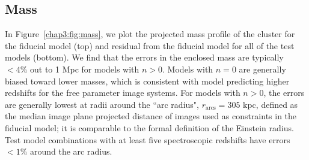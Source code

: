 \subsection{Mass}
In Figure~\ref{chap3:fig:mass}, we plot the projected mass profile of the cluster for the fiducial model (top) and residual from the fiducial model for all of the test models (bottom). We find that the errors in the enclosed mass are typically $<4\%$ out to 1 Mpc for models with $n>0$. Models with $n=0$ are generally biased toward lower masses, which is consistent with model predicting higher redshifts for the free parameter image systems. For models with $n>0$, the errors are generally lowest at radii around the ``arc radius", $r_\mathrm{arcs}=305$ kpc, defined as the median image plane projected distance of images used as constraints in the fiducial model; it is comparable to the formal definition of the Einstein radius. Test model combinations with at least five spectroscopic redshifts have errors $<1\%$ around the arc radius.


